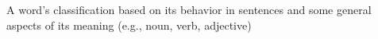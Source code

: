 A word's classification based on its behavior in sentences and some general aspects of its meaning (e.g., noun, verb, adjective)
